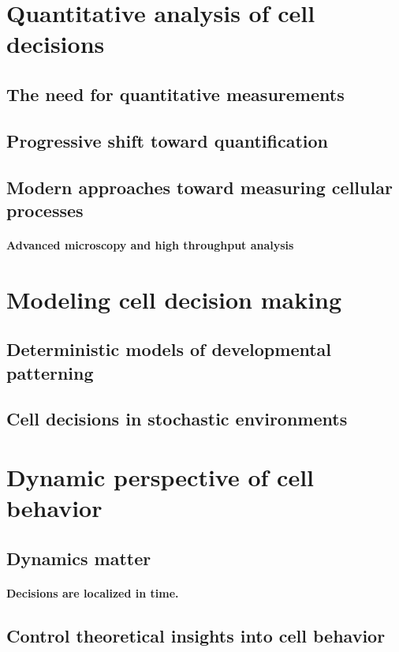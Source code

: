 \section{Quantitative analysis of cell decisions}

	\subsection{The need for quantitative measurements}	
	\subsection{Progressive shift toward quantification}
	\subsection{Modern approaches toward measuring cellular processes}
		\paragraph{Advanced microscopy and high throughput analysis}
	
\section{Modeling cell decision making}

	\subsection{Deterministic models of developmental patterning}	
	\subsection{Cell decisions in stochastic environments}

\section{Dynamic perspective of cell behavior}

	\subsection{Dynamics matter}
		\paragraph{Decisions are localized in time.}
	\subsection{Control theoretical insights into cell behavior}

